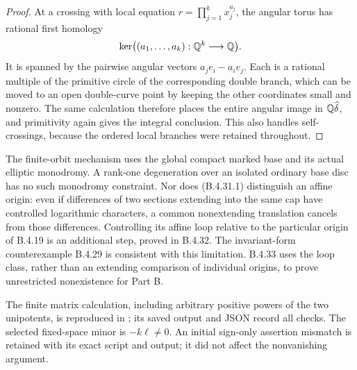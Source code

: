 \begin{proof}
At a crossing with local equation
$r=\prod_{j=1}^k x_j^{a_j}$, the angular torus has
rational first homology
\[
 \ker\bigl((a_1,\ldots,a_k):\mathbb Q^k\longrightarrow\mathbb Q\bigr).
\]
It is spanned by the pairwise angular vectors
$a_j e_i-a_i e_j$. Each is a rational multiple of the
primitive circle of the corresponding double branch,
which can be moved to an open double-curve point by
keeping the other coordinates small and nonzero.
The same calculation therefore places the entire angular
image in $\mathbb Q\widehat\delta$, and primitivity again gives
the integral conclusion. This also handles self-crossings,
because the ordered local branches were retained throughout.
\end{proof}

\begin{remark}
The finite-orbit mechanism uses the global compact marked
base and its actual elliptic monodromy. A rank-one degeneration
over an isolated ordinary base disc has no such monodromy
constraint. Nor does (B.4.31.1) distinguish an affine origin:
even if differences of two sections extending into the same
cap have controlled logarithmic characters, a common
nonextending translation cancels from those differences.
Controlling its affine loop relative to the particular
origin of B.4.19 is an additional step, proved in B.4.32.
The invariant-form counterexample B.4.29 is consistent with
this limitation. B.4.33 uses the loop class, rather than
an extending comparison of individual origins, to prove
unrestricted nonexistence for Part B.
\end{remark}

The finite matrix calculation, including arbitrary positive
powers of the two unipotents, is reproduced in
; its saved output and
JSON record all checks. The selected fixed-space minor is
$-k\ell\ne0$. An initial sign-only assertion mismatch is
retained with its exact script and output; it did not affect
the nonvanishing argument.
